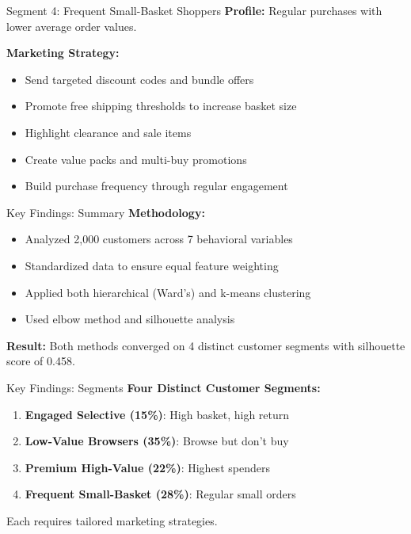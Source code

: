 \documentclass[aspectratio=169,ignorenonframetext]{beamer}
\begin{document}
\begin{frame}{Segment 4: Frequent Small-Basket Shoppers}
\textbf{Profile:} Regular purchases with lower average order values.

\textbf{Marketing Strategy:}

\begin{itemize}
\item
  Send targeted discount codes and bundle offers
\item
  Promote free shipping thresholds to increase basket size
\item
  Highlight clearance and sale items
\item
  Create value packs and multi-buy promotions
\item
  Build purchase frequency through regular engagement
\end{itemize}
\end{frame}

\begin{frame}{Key Findings: Summary}
\textbf{Methodology:}

\begin{itemize}
\item
  Analyzed 2,000 customers across 7 behavioral variables
\item
  Standardized data to ensure equal feature weighting
\item
  Applied both hierarchical (Ward's) and k-means clustering
\item
  Used elbow method and silhouette analysis
\end{itemize}

\textbf{Result:} Both methods converged on 4 distinct customer segments
with silhouette score of 0.458.
\end{frame}

\begin{frame}{Key Findings: Segments}
\textbf{Four Distinct Customer Segments:}

\begin{enumerate}
\item
  \textbf{Engaged Selective (15\%)}: High basket, high return
\item
  \textbf{Low-Value Browsers (35\%)}: Browse but don't buy
\item
  \textbf{Premium High-Value (22\%)}: Highest spenders
\item
  \textbf{Frequent Small-Basket (28\%)}: Regular small orders
\end{enumerate}

Each requires tailored marketing strategies.
\end{frame}
\end{document}
